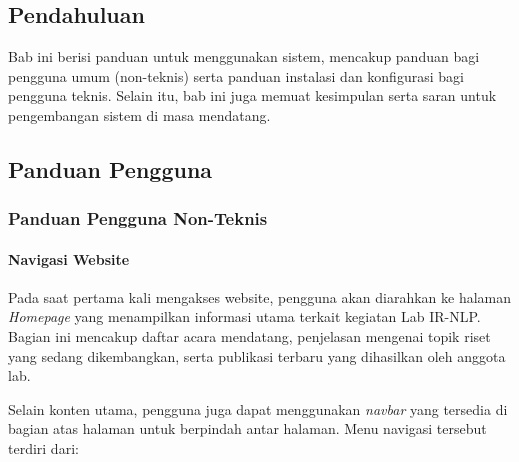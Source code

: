 \chapter{\babLima}
\section{Pendahuluan}
Bab ini berisi panduan untuk menggunakan sistem, mencakup panduan bagi pengguna umum (non-teknis) serta panduan instalasi dan konfigurasi bagi pengguna teknis. Selain itu, bab ini juga memuat kesimpulan serta saran untuk pengembangan sistem di masa mendatang.

\section{Panduan Pengguna}

\subsection{Panduan Pengguna Non-Teknis}
\subsubsection{Navigasi Website}

Pada saat pertama kali mengakses website, pengguna akan diarahkan ke halaman \textit{Homepage} yang menampilkan informasi utama terkait kegiatan Lab IR-NLP. Bagian ini mencakup daftar acara mendatang, penjelasan mengenai topik riset yang sedang dikembangkan, serta publikasi terbaru yang dihasilkan oleh anggota lab.

Selain konten utama, pengguna juga dapat menggunakan \textit{navbar} yang tersedia di bagian atas halaman untuk berpindah antar halaman. Menu navigasi tersebut terdiri dari:


